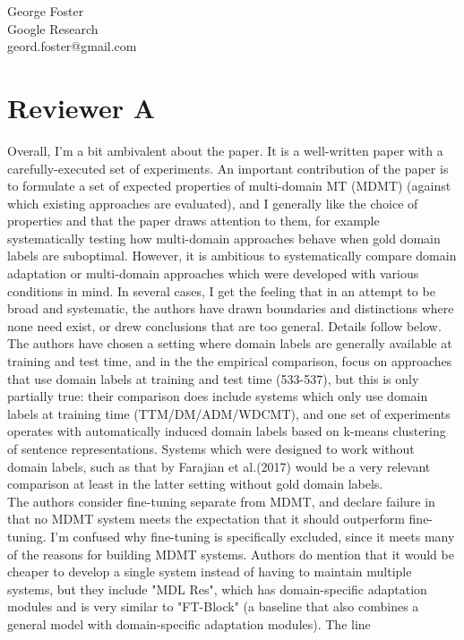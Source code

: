 \documentclass[12pt,times,a4paper,twoside]{article}
\theoremstyle{definition}
\begin{document}
\noindent George Foster\\
\noindent Google Research\\
\noindent geord.foster@gmail.com


\section*{Reviewer A}

Overall, I'm a bit ambivalent about the paper. It is a well-written paper with a carefully-executed set of experiments. An important contribution of the paper is to formulate a set of expected properties of multi-domain MT (MDMT) (against which existing approaches are evaluated), and I generally like the choice of properties and that the paper draws attention to them, for example systematically testing how multi-domain approaches behave when gold domain labels are suboptimal. However, it is ambitious to systematically compare domain adaptation or multi-domain approaches which were developed with various conditions in mind. In several cases, I get the feeling that in an attempt to be broad and systematic, the authors have drawn boundaries and distinctions where none need exist, or drew conclusions that are too general. Details follow below.
\\
The authors have chosen a setting where domain labels are generally
available at training and test time, and in the the empirical comparison, focus on approaches that use domain labels at training and test time (533-537), but this is only partially true: their comparison does include systems which only use domain labels at training time (TTM/DM/ADM/WDCMT), and one set of experiments operates with automatically induced domain labels based on k-means clustering of sentence representations. Systems which were designed to work without domain labels, such as that by Farajian et al.(2017) would be a very relevant comparison at least in the latter setting without gold domain labels.
\\
The authors consider fine-tuning separate from MDMT, and declare failure in that no MDMT system meets the expectation that it should outperform fine-tuning. I'm confused why fine-tuning is specifically excluded, since it meets many of the reasons for building MDMT systems. Authors do mention that it would be cheaper to develop a single system instead of having to maintain multiple systems, but they include "MDL Res", which has domain-specific adaptation modules and is very similar to "FT-Block" (a baseline that also combines a general model with domain-specific adaptation modules). The line
\end{document}
